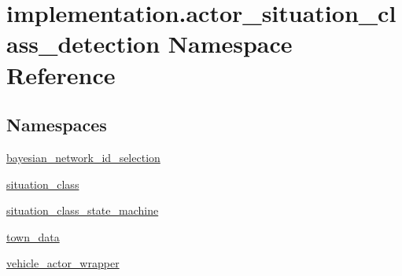 \hypertarget{namespaceimplementation_1_1actor__situation__class__detection}{}\section{implementation.\+actor\+\_\+situation\+\_\+class\+\_\+detection Namespace Reference}
\label{namespaceimplementation_1_1actor__situation__class__detection}
\subsection*{Namespaces}
\begin{DoxyCompactItemize}
\item 
 \hyperlink{namespaceimplementation_1_1actor__situation__class__detection_1_1bayesian__network__id__selection}{bayesian\+\_\+network\+\_\+id\+\_\+selection}
\item 
 \hyperlink{namespaceimplementation_1_1actor__situation__class__detection_1_1situation__class}{situation\+\_\+class}
\item 
 \hyperlink{namespaceimplementation_1_1actor__situation__class__detection_1_1situation__class__state__machine}{situation\+\_\+class\+\_\+state\+\_\+machine}
\item 
 \hyperlink{namespaceimplementation_1_1actor__situation__class__detection_1_1town__data}{town\+\_\+data}
\item 
 \hyperlink{namespaceimplementation_1_1actor__situation__class__detection_1_1vehicle__actor__wrapper}{vehicle\+\_\+actor\+\_\+wrapper}
\end{DoxyCompactItemize}
